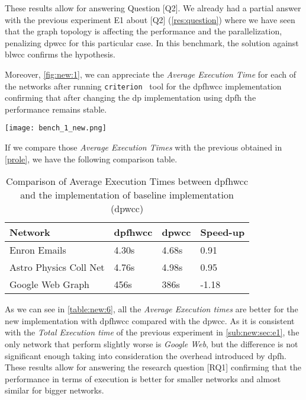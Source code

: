 These results allow for answering Question [Q2].
We already had a partial answer with the previous experiment E1 about [Q2] (\autoref{res:question}) where we have seen that the graph topology is affecting the performance and the parallelization, penalizing \acrshort{dpwcc} for this particular case. 
In this benchmark, the solution against \acrshort{blwcc} confirms the hypothesis. 

Moreover, \autoref{fig:new:1}, we can appreciate the \textit{Average Execution Time} for each of the networks after running \texttt{criterion}~\cite{criterion} tool for the \acrshort{dpfhwcc} implementation confirming that after changing the \acrshort{dp} implementation using \acrshort{dpfh} the performance remains stable.

\begin{minipage}[t]{\linewidth}
  \texttt{[image: bench\_1\_new.png]}
  \captionsetup{type=figure}
  \label{fig:new:1}
\end{minipage}

If we compare those \textit{Average Execution Times} with the previous obtained in \autoref{prole}, we have the following comparison table.

 \begin{table}[H]
  \centering
  \begin{tabular}{|l|l|l|l|}
   \hline
   \textbf{Network} & \textbf{\acrshort{dpfhwcc}} & \textbf{\acrshort{dpwcc}} & \textbf{Speed-up}\\
   \hline
   Enron Emails & 4.30s & 4.68s &  0.91\\
   \hline
   Astro Physics Coll Net & 4.76s  & 4.98s & 0.95\\
   \hline
   Google Web Graph & 456s & 386s & -1.18\\
   \hline
  \end{tabular}
 \caption{Comparison of Average Execution Times between \acrshort{dpfhwcc} and the implementation of baseline implementation (\acrshort{dpwcc})}
 \label{table:new:6}
 \end{table}

As we can see in \autoref{table:new:6}, all the \textit{Average Execution times} are better for the new implementation with \acrshort{dpfhwcc} compared with the \acrshort{dpwcc}.
As it is consistent with the \textit{Total Execution time} of the previous experiment in \autoref{sub:new:sec:e1}, the only network that perform slightly worse is \textit{Google Web}, but the difference is not significant enough taking into consideration the overhead introduced by \acrshort{dpfh}.
These results allow for answering the research question [RQ1] confirming that the performance in terms of execution is better for smaller networks and almost similar for bigger networks. 


